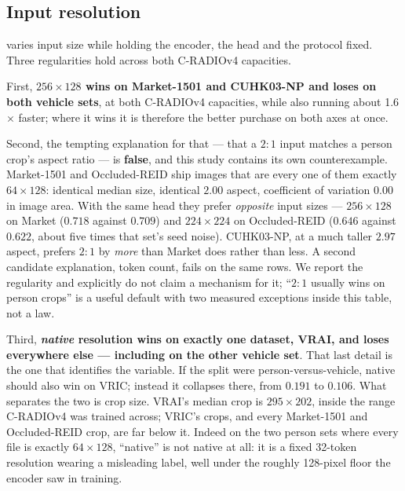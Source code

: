 \subsection{Input resolution}
 varies input size while holding the encoder, the head and the protocol
fixed. Three regularities hold across both C-RADIOv4 capacities.

\begin{table}[t]
\centering
\caption{Input geometry, ArcFace mAP. Rows 1--3 and 4--6 vary resolution within one
checkpoint; rows 7--8 vary only the resize convention. \emph{native} feeds each image at its
own size, snapped to the patch grid and capped at 512 pixels.}
\label{tab:geometry}
\scriptsize
\setlength{\tabcolsep}{3pt}

\end{table}

First, \textbf{$256\times128$ wins on Market-1501 and CUHK03-NP and loses on both vehicle
sets}, at both C-RADIOv4 capacities, while also running about 1.6$\times$ faster; where it
wins it is therefore the better purchase on both axes at once.

Second, the tempting explanation for that --- that a $2{:}1$ input matches a person crop's
aspect ratio --- is \textbf{false}, and this study contains its own counterexample.
Market-1501 and Occluded-REID ship images that are every one of them exactly $64\times128$:
identical median size, identical $2.00$ aspect, coefficient of variation $0.00$ in image area.
With the same head they prefer \emph{opposite} input sizes --- $256\times128$ on Market
($0.718$ against $0.709$) and $224\times224$ on Occluded-REID ($0.646$ against $0.622$, about
five times that set's seed noise). CUHK03-NP, at a much taller $2.97$ aspect, prefers $2{:}1$
by \emph{more} than Market does rather than less. A second candidate explanation, token count,
fails on the same rows. We report the regularity and explicitly do not claim a mechanism for
it; ``$2{:}1$ usually wins on person crops'' is a useful default with two measured exceptions
inside this table, not a law.

Third, \textbf{\emph{native} resolution wins on exactly one dataset, VRAI, and loses
everywhere else --- including on the other vehicle set}. That last detail is the one that
identifies the variable. If the split were person-versus-vehicle, native should also win on
VRIC; instead it collapses there, from $0.191$ to $0.106$. What separates the two is crop
size. VRAI's median crop is $295\times202$, inside the range C-RADIOv4 was trained across;
VRIC's crops, and every Market-1501 and Occluded-REID crop, are far below it. Indeed on the two
person sets where every file is exactly $64\times128$, ``native'' is not native at all: it is a
fixed 32-token resolution wearing a misleading label, well under the roughly 128-pixel floor
the encoder saw in training.


